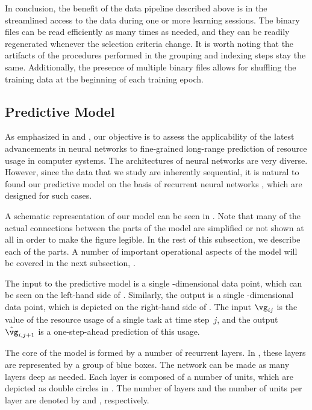 In conclusion, the benefit of the data pipeline described above is in the
streamlined access to the data during one or more learning sessions. The binary
files can be read efficiently as many times as needed, and they can be readily
regenerated whenever the selection criteria change. It is worth noting that the
artifacts of the procedures performed in the grouping and indexing steps stay
the same. Additionally, the presence of multiple binary files allows for
shuffling the training data at the beginning of each training epoch.

\subsection{Predictive Model}

As emphasized in  and , our
objective is to assess the applicability of the latest advancements in neural
networks \cite{goodfellow2016} to fine-grained long-range prediction of resource
usage in computer systems. The architectures of neural networks are very
diverse. However, since the data that we study are inherently sequential, it is
natural to found our predictive model on the basis of recurrent neural networks
\cite{goodfellow2016}, which are designed for such cases.

A schematic representation of our model can be seen in
. Note that many of the actual connections between
the parts of the model are simplified or not shown at all in order to make the
figure legible. In the rest of this subsection, we describe each of the parts. A
number of important operational aspects of the model will be covered in the next
subsection, .

The input to the predictive model is a single \ng-dimensional data point, which
can be seen on the left-hand side of . Similarly,
the output is a single \ng-dimensional data point, which is depicted on the
right-hand side of . The input $\vg_{ij}$ is the
value of the resource usage of a single task at time step~$j$, and the output
$\hat{\vg}_{i, j + 1}$ is a one-step-ahead prediction of this usage.

The core of the model is formed by a number of recurrent layers. In
, these layers are represented by a group of blue
boxes. The network can be made as many layers deep as needed. Each layer is
composed of a number of units, which are depicted as double circles in
. The number of layers and the number of units per
layer are denoted by \nl and \nu, respectively.

